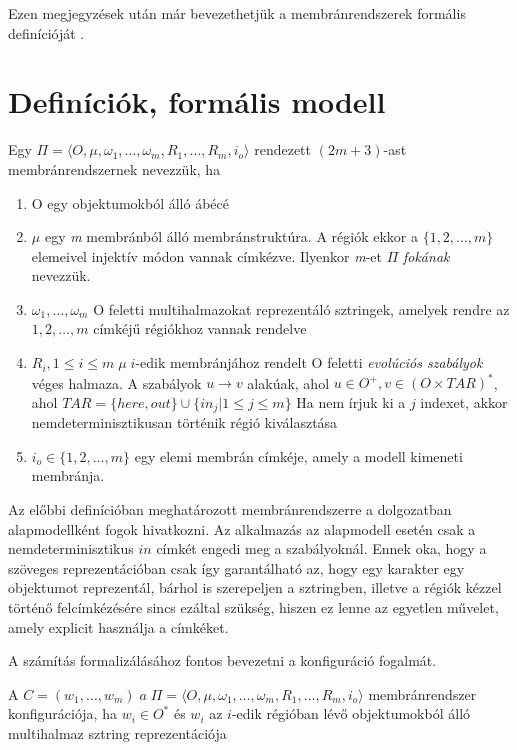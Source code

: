 Ezen megjegyzések után már bevezethetjük a membránrendszerek formális definícióját \cite{tichler_slides}.

\section{Definíciók, formális modell}

\begin{definition}
Egy $\Pi = \langle O, \mu , \omega_1 , \dots , \omega_m, R_1 , \dots , R_m , i_o  \rangle$ rendezett $(2m + 3)$-ast membránrendszernek  nevezzük, ha

\begin{enumerate}
\item O egy objektumokból álló ábécé
\item $\mu$ egy \textit{m} membránból álló membránstruktúra. A régiók ekkor a $\{1,2, \dots, m\}$ elemeivel injektív módon vannak címkézve. Ilyenkor \textit{m}-et $\Pi$ \textit{fokának} nevezzük.

\item  $\omega_1 , \dots , \omega_m$ O feletti multihalmazokat reprezentáló sztringek, amelyek rendre az $1, 2, \dots, m$ címkéjű régiókhoz vannak rendelve

\item $R_i, 1 \leq i \leq m \; \mu \; i$-edik membránjához rendelt O feletti \textit{evolúciós szabályok} véges halmaza. A szabályok $u \rightarrow v$ alakúak, ahol $u \in O^+, v \in (O \times TAR)^*$, ahol $TAR=\{here, out\} \cup \{ in_j | 1  \leq j \leq m \} $ Ha nem írjuk ki a $j$ indexet, akkor nemdeterminisztikusan történik régió kiválasztása

\item$ i_o \in \{1,2, \dots, m\}$ egy elemi membrán címkéje, amely a modell kimeneti membránja.
\end{enumerate}
\end{definition}

Az előbbi definícióban meghatározott membránrendszerre a dolgozatban alapmodellként fogok hivatkozni. Az alkalmazás az alapmodell esetén csak a nemdeterminisztikus $in$ címkét engedi meg a szabályoknál. Ennek oka, hogy a szöveges reprezentációban csak így garantálható az, hogy egy karakter egy objektumot reprezentál, bárhol is szerepeljen a sztringben, illetve a régiók kézzel történő felcímkézésére sincs ezáltal szükség, hiszen ez lenne az egyetlen művelet, amely explicit használja a címkéket. 

A számítás formalizálásához fontos bevezetni a konfiguráció fogalmát.
\begin{definition}\label{def:mem_sysm}
A $C = (w_1, \dots, w_m)  \; a  \; \Pi = \langle O, \mu , \omega_1 , \dots , \omega_m, R_1 , \dots , R_m , i_o  \rangle$ membránrendszer konfigurációja, ha $w_i \in O^*$ és $w_i$ az $i$-edik régióban lévő objektumokból álló multihalmaz sztring reprezentációja
\end{definition}

